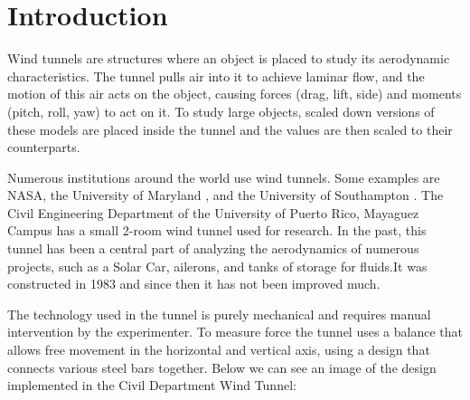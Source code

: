 \section{Introduction}
		Wind tunnels \cite{ref:intro1} are structures where an object is placed to study its aerodynamic
		characteristics. The tunnel pulls air into it to achieve laminar flow, and the motion of this air
		acts on the object, causing forces (drag, lift, side) and moments (pitch, roll, yaw) to act on it.
		To study large objects, scaled down versions of these models are placed inside the tunnel and the
		values are then scaled to their counterparts. 
		 
		Numerous institutions around the world use wind tunnels. 
		Some examples are NASA, the University of Maryland \cite{ref:intro2}, and the University 
		of Southampton \cite{ref:intro3}. The Civil Engineering Department of the University of 
		Puerto Rico, Mayaguez Campus \cite{ref:intro4} has a small 2-room wind tunnel used for research. 
		In the past, this tunnel has been a central part of analyzing the aerodynamics of numerous
		projects, such as a Solar Car, ailerons, and tanks of storage for fluids.It was constructed in 
		1983 and since then it has not been improved much.
		


		The technology used in the tunnel is purely mechanical and requires manual intervention by 
		the experimenter. To measure force the tunnel uses a balance that allows free movement in 
		the horizontal and vertical axis, using a design that connects various steel bars together.
		Below we can see an image of the design implemented in the Civil Department Wind Tunnel: 

